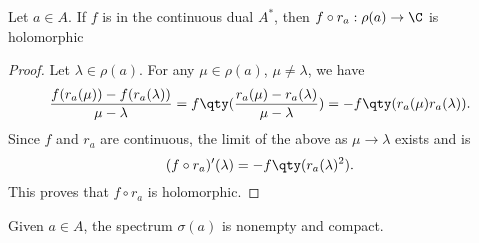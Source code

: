 \begin{lemma}\label{lem:resolvent_derivative}
Let $a \in A$. If $f$ is in the continuous dual $A^*$, then $f \circ r_a :\rho(a) \rightarrow \C$ is holomorphic %
\end{lemma}

\begin{proof}
Let $\lambda \in \rho(a)$. For any $\mu \in \rho(a)$, $\mu \neq \lambda$, we have
\begin{equation}
\frac{f(r_a(\mu)) - f(r_a(\lambda))}{\mu - \lambda} = f\qty(\frac{r_a(\mu) - r_a(\lambda)}{\mu - \lambda}) = -f\qty(r_a(\mu)r_a(\lambda)).
\end{equation}
Since $f$ and $r_a$ are continuous, the limit of the above as $\mu \rightarrow \lambda$ exists and is
\begin{equation}
(f \circ r_a)'(\lambda)  = -f\qty(r_a(\lambda)^2).
\end{equation}
This proves that $f \circ r_a$ is holomorphic. %
%
\end{proof}


\begin{corollary}
Given $a \in A$, the spectrum $\sigma(a)$ is nonempty and compact.
\end{corollary}

